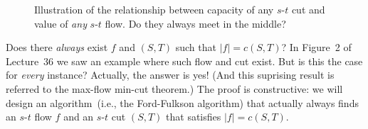 \begin{figure}[h]
\centering{}
\caption{Illustration of the relationship between capacity of any $s$-$t$ cut
and value of \emph{any} $s$-$t$ flow.  Do they always meet in the middle?}
\label{fig:flow-meet}
\end{figure}

Does there \emph{always} exist $f$ and $(S,T)$ such that $|f| = c(S,T)$?
In Figure~2 of Lecture~36 we saw an example where such flow and cut exist.
But is this the case for \emph{every} instance?
Actually, the answer is yes! (And this suprising result is referred to the max-flow min-cut theorem.)
The proof is constructive: we will design an algorithm~(i.e., the Ford-Fulkson algorithm)
that actually always finds an $s$-$t$ flow $f$ and an $s$-$t$ cut $(S, T)$
that satisfies $|f| = c(S, T)$.


